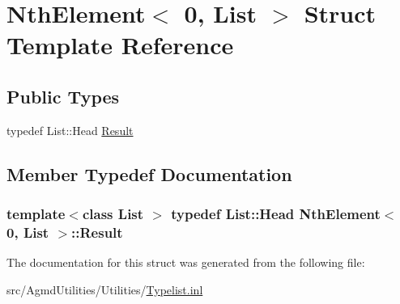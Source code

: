 \hypertarget{struct_nth_element_3_010_00_01_list_01_4}{\section{Nth\+Element$<$ 0, List $>$ Struct Template Reference}
\label{struct_nth_element_3_010_00_01_list_01_4}
}
\subsection*{Public Types}
\begin{DoxyCompactItemize}
\item 
typedef List\+::\+Head \hyperlink{struct_nth_element_3_010_00_01_list_01_4_a94d4d476924e953783de793546a8486d}{Result}
\end{DoxyCompactItemize}


\subsection{Member Typedef Documentation}
\hypertarget{struct_nth_element_3_010_00_01_list_01_4_a94d4d476924e953783de793546a8486d}{
\subsubsection[{Result}]{\setlength{\rightskip}{0pt plus 5cm}template$<$class List $>$ typedef List\+::\+Head {\bf Nth\+Element}$<$ 0, List $>$\+::{\bf Result}}}\label{struct_nth_element_3_010_00_01_list_01_4_a94d4d476924e953783de793546a8486d}


The documentation for this struct was generated from the following file\+:\begin{DoxyCompactItemize}
\item 
src/\+Agmd\+Utilities/\+Utilities/\hyperlink{_typelist_8inl}{Typelist.\+inl}\end{DoxyCompactItemize}
